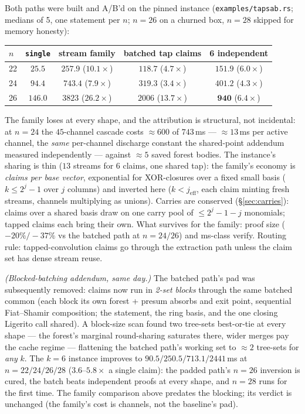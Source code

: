\documentclass[11pt]{article}
\DeclareRobustCommand{\code}[1]{{\def\_{\textunderscore\allowbreak}\texttt{#1}}}
\theoremstyle{plain}
\theoremstyle{definition}
\theoremstyle{remark}
\begin{document}
Both paths were built and A/B'd on the pinned instance
(\code{examples/taps\_ab.rs}; medians of 5, one statement per $n$;
$n{=}26$ on a churned box, $n{=}28$ skipped for memory honesty):

\begin{center}\small
\begin{tabular}{@{}lcccc@{}}
\toprule
$n$ & \code{single} & stream family & batched tap claims & 6 independent\\
\midrule
22 & $25.5$ & $257.9$ \;($10.1\times$) & $\mathbf{118.7}$ \;($4.7\times$) & $151.9$ \;($6.0\times$)\\
24 & $94.4$ & $743.4$ \;($7.9\times$) & $\mathbf{319.3}$ \;($3.4\times$) & $401.2$ \;($4.3\times$)\\
26 & $146.0$ & $3823$ \;($26.2\times$) & $2006$ \;($13.7\times$) & $\mathbf{940}$ \;($6.4\times$)\\
\bottomrule
\end{tabular}
\end{center}

\noindent The family loses at every shape, and the attribution is
structural, not incidental: at $n{=}24$ the $45$-channel cascade costs
${\approx}600$ of $743$\,ms --- ${\approx}13$\,ms per active channel,
the \emph{same} per-channel discharge constant the shared-point
addendum measured independently --- against ${\approx}5$ saved forest
bodies. The instance's sharing is thin ($13$ streams for $6$ claims,
one shared tap): the family's economy is \emph{claims per base vector},
exponential for XOR-closures over a fixed small basis
($k\le 2^{j}-1$ over $j$ columns) and inverted here ($k<j_{\mathrm{eff}}$,
each claim minting fresh streams, channels multiplying as unions).
Carries are conserved (\S\ref{sec:carries}): claims over a shared basis
draw on one carry pool of $\le 2^{j}{-}1{-}j$ monomials; tapped claims
each bring their own. What survives for the family: proof size
($-20\%/-37\%$ vs the batched path at $n{=}24/26$) and ms-class verify.
Routing rule: tapped-convolution claims go through the extraction path
unless the claim set has dense stream reuse.

\emph{(Blocked-batching addendum, same day.)} The batched path's pad
was subsequently removed: claims now run in \emph{2-set blocks}
through the same batched common (each block its own forest + presum
absorbs and exit point, sequential Fiat--Shamir composition; the
statement, the ring basis, and the one closing Ligerito call shared).
A block-size scan found two tree-sets best-or-tie at every shape ---
the forest's marginal round-sharing saturates there, wider merges pay
the cache regime --- flattening the batched path's working set to
${\approx}2$ tree-sets for \emph{any} $k$. The $k{=}6$ instance
improves to $90.5/250.5/713.1/2441$\,ms at $n=22/24/26/28$
($3.6$--$5.8\times$ a single claim): the padded path's $n{=}26$
inversion is cured, the batch beats independent proofs at every
shape, and $n{=}28$ runs for the first time. The family comparison
above predates the blocking; its verdict is unchanged (the family's
cost is channels, not the baseline's pad).
\end{document}

